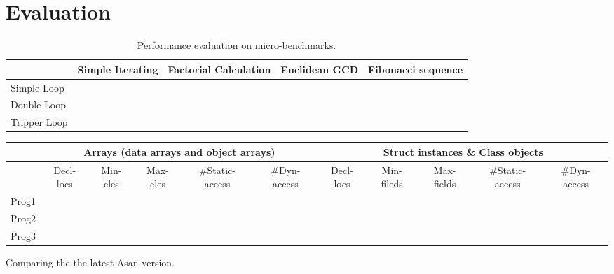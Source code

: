 \section{Evaluation}


\begin{table}[tp]
    \begin{tabular}{|l|l|l|l|l|}
        \hline
                     & Simple Iterating & Factorial Calculation & Euclidean GCD & Fibonacci sequence \\ \hline
        Simple Loop  &                  &                       &               &                    \\ \hline
        Double Loop  &                  &                       &               &                    \\ \hline
        Tripper Loop &                  &                       &               &                    \\ \hline
    \end{tabular}
    \caption{Performance evaluation on micro-benchmarks.}
\end{table}


\begin{table*}[]
    \begin{tabular}{|c|c|c|c|c|c|c|c|c|c|c|}
        \hline
              & \multicolumn{5}{c|}{Arrays (data arrays and object arrays)} & \multicolumn{5}{c|}{Struct instances \& Class objects}                                                                                                                    \\ \hline
              & Decl-locs                                                   & Min-eles                                               & Max-eles & \#Static-access & \#Dyn-access & Decl-locs & Min-fileds & Max-fields & \#Static-access & \#Dyn-access \\ \hline
        Prog1 &                                                             &                                                        &          &                 &              &           &            &            &                 &              \\ \hline
        Prog2 &                                                             &                                                        &          &                 &              &           &            &            &                 &              \\ \hline
        Prog3 &                                                             &                                                        &          &                 &              &           &            &            &                 &              \\ \hline
    \end{tabular}
\end{table*}



Comparing the the latest Asan version.

